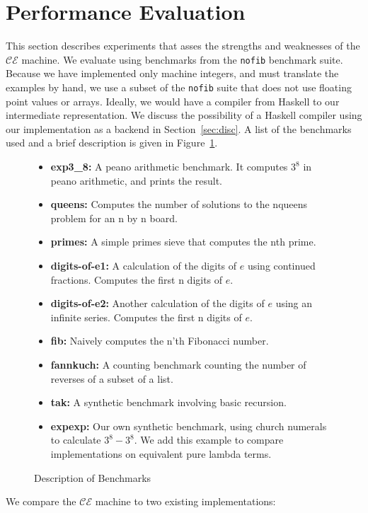 \section{Performance Evaluation} \label{sec:eval}

This section describes experiments that asses the strengths and weaknesses of
the $\mathcal{CE}$ machine. We evaluate using benchmarks from the \texttt{nofib}
benchmark suite. Because we have implemented only machine integers, and must
translate the examples by hand, we use a subset of the \texttt{nofib} suite that
does not use floating point values or arrays. Ideally, we would have a compiler
from Haskell to our intermediate representation. We discuss the possibility of a
Haskell compiler using our implementation as a backend in
Section~\ref{sec:disc}. A list of the benchmarks used and a brief description is
given in Figure~\ref{fig:bench}.

\begin{figure}
\begin{itemize}
\item \textbf{exp3\_8:} A peano arithmetic benchmark. It computes $3^8$ in
peano arithmetic, and prints the result. 
\item \textbf{queens:} Computes the number of solutions to the nqueens problem
for an n by n board.
\item \textbf{primes:} A simple primes sieve that computes the nth prime.
\item \textbf{digits-of-e1:} A calculation of the digits of $e$ using continued
fractions. Computes the first n digits of $e$.
\item \textbf{digits-of-e2:} Another calculation of the digits of $e$ using an
infinite series. Computes the first n digits of $e$. 
\item \textbf{fib:} Naively computes the n'th Fibonacci number.
\item \textbf{fannkuch:} A counting benchmark counting the number of reverses of
a subset of a list.
\item \textbf{tak:} A synthetic benchmark involving basic recursion.
\item \textbf{expexp:} Our own synthetic benchmark, using church numerals to
calculate $3^8-3^8$. We add this example to compare implementations on
equivalent pure lambda terms.
\end{itemize}
\caption{Description of Benchmarks}
\label{fig:bench}
\end{figure}

We compare the $\mathcal{CE}$ machine to two existing implementations:

